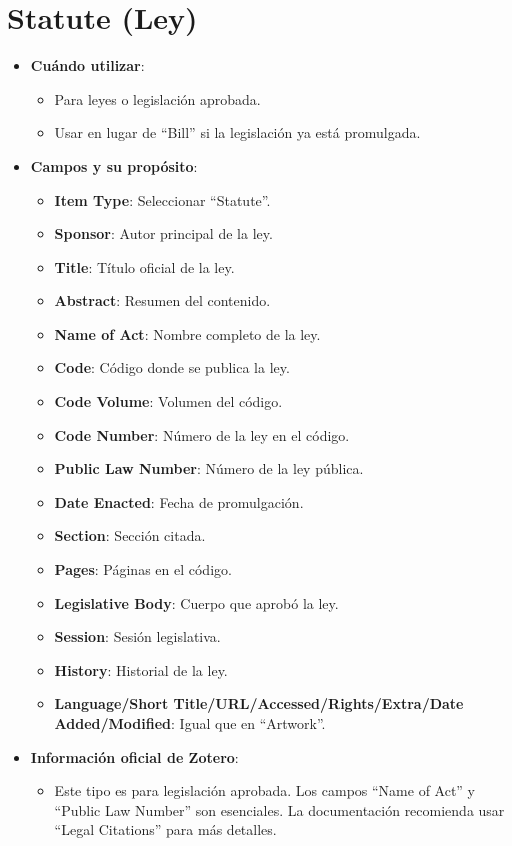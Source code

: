\documentclass[
  jou,
  floatsintext,
  longtable,
  a4paper,
  nolmodern,
  notxfonts,
  notimes,
  12pt,
  colorlinks=true,linkcolor=blue,citecolor=blue,urlcolor=blue]{apa7}
\providecommand{\tightlist}{%
  \setlength{\itemsep}{0pt}\setlength{\parskip}{0pt}}
\begin{document}
\section{Statute (Ley)}\label{statute-ley}

\begin{itemize}
\tightlist
\item
  \textbf{Cuándo utilizar}:

  \begin{itemize}
  \tightlist
  \item
    Para leyes o legislación aprobada.
  \item
    Usar en lugar de ``Bill'' si la legislación ya está promulgada.
  \end{itemize}
\item
  \textbf{Campos y su propósito}:

  \begin{itemize}
  \tightlist
  \item
    \textbf{Item Type}: Seleccionar ``Statute''.
  \item
    \textbf{Sponsor}: Autor principal de la ley.
  \item
    \textbf{Title}: Título oficial de la ley.
  \item
    \textbf{Abstract}: Resumen del contenido.
  \item
    \textbf{Name of Act}: Nombre completo de la ley.
  \item
    \textbf{Code}: Código donde se publica la ley.
  \item
    \textbf{Code Volume}: Volumen del código.
  \item
    \textbf{Code Number}: Número de la ley en el código.
  \item
    \textbf{Public Law Number}: Número de la ley pública.
  \item
    \textbf{Date Enacted}: Fecha de promulgación.
  \item
    \textbf{Section}: Sección citada.
  \item
    \textbf{Pages}: Páginas en el código.
  \item
    \textbf{Legislative Body}: Cuerpo que aprobó la ley.
  \item
    \textbf{Session}: Sesión legislativa.
  \item
    \textbf{History}: Historial de la ley.
  \item
    \textbf{Language/Short Title/URL/Accessed/Rights/Extra/Date
    Added/Modified}: Igual que en ``Artwork''.
  \end{itemize}
\item
  \textbf{Información oficial de Zotero}:

  \begin{itemize}
  \tightlist
  \item
    Este tipo es para legislación aprobada. Los campos ``Name of Act'' y
    ``Public Law Number'' son esenciales. La documentación recomienda
    usar ``Legal Citations'' para más detalles.
  \end{itemize}
\end{itemize}
\end{document}
